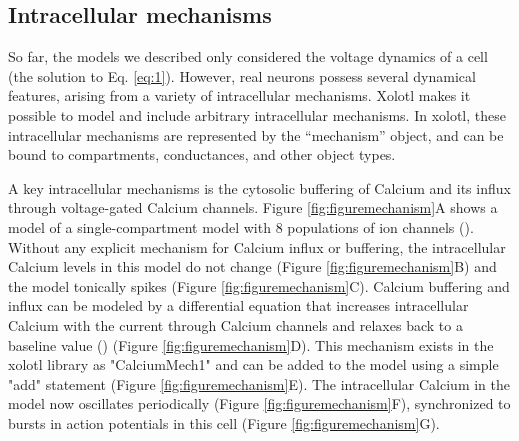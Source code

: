 \documentclass{frontiersSCNS} %
\begin{document}
%
%
%
%
%
%



\subsection{Intracellular mechanisms}

So far, the models we described only considered the voltage dynamics of a cell (the solution to Eq. \ref{eq:1}). However, real neurons possess several dynamical features, arising from a variety of intracellular mechanisms. Xolotl makes it possible to model and include arbitrary intracellular mechanisms. In xolotl, these intracellular mechanisms are represented by the ``mechanism'' object, and can be bound to compartments, conductances, and other object types.

A key intracellular mechanisms is the cytosolic buffering of Calcium and its influx through voltage-gated Calcium channels. Figure \ref{fig:figuremechanism}A shows a model of a single-compartment model with 8 populations of ion channels (\cite{liuModelNeuronActivityDependent1998}). Without any explicit mechanism for Calcium influx or buffering, the intracellular Calcium levels in this model do not change (Figure \ref{fig:figuremechanism}B) and the model tonically spikes (Figure \ref{fig:figuremechanism}C). Calcium buffering and influx can be modeled by a differential equation that increases intracellular Calcium with the current through Calcium channels and relaxes back to a baseline value (\cite{liuModelNeuronActivityDependent1998, prinzAlternativeHandtuningConductancebased2003, dayanTheoreticalNeuroscience2001}) (Figure \ref{fig:figuremechanism}D). This mechanism exists in the xolotl library as "CalciumMech1" and can be added to the model using a simple "add" statement (Figure \ref{fig:figuremechanism}E). The intracellular Calcium in the model now oscillates periodically (Figure \ref{fig:figuremechanism}F), synchronized to bursts in action potentials in this cell (Figure \ref{fig:figuremechanism}G).
\end{document}
